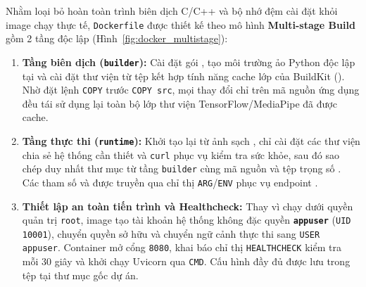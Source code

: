 Nhằm loại bỏ hoàn toàn trình biên dịch C/C++ và bộ nhớ đệm cài đặt khỏi image chạy thực tế, \texttt{Dockerfile} được thiết kế theo mô hình \textbf{Multi-stage Build} gồm 2 tầng độc lập (Hình~\ref{fig:docker_multistage}):
\begin{enumerate}
    \item \textbf{Tầng biên dịch (\texttt{builder}):} Cài đặt gói , tạo môi trường ảo Python độc lập tại  và cài đặt thư viện từ tệp  kết hợp tính năng cache lớp của BuildKit (). Nhờ đặt lệnh \texttt{COPY}  trước \texttt{COPY src}, mọi thay đổi chỉ trên mã nguồn ứng dụng đều tái sử dụng lại toàn bộ lớp thư viện TensorFlow/MediaPipe đã được cache.
    \item \textbf{Tầng thực thi (\texttt{runtime}):} Khởi tạo lại từ ảnh sạch , chỉ cài đặt các thư viện chia sẻ hệ thống cần thiết và \texttt{curl} phục vụ kiểm tra sức khỏe, sau đó sao chép duy nhất thư mục  từ tầng \texttt{builder} cùng mã nguồn  và tệp trọng số . Các tham số  và  được truyền qua chỉ thị \texttt{ARG}/\texttt{ENV} phục vụ endpoint .
    \item \textbf{Thiết lập an toàn tiến trình và Healthcheck:} Thay vì chạy dưới quyền quản trị \texttt{root}, image tạo tài khoản hệ thống không đặc quyền \textbf{\texttt{appuser}} (\texttt{UID 10001}), chuyển quyền sở hữu  và chuyển ngữ cảnh thực thi sang \texttt{USER appuser}. Container mở cổng \texttt{8080}, khai báo chỉ thị \texttt{HEALTHCHECK} kiểm tra  mỗi 30 giây và khởi chạy Uvicorn qua \texttt{CMD}. Cấu hình đầy đủ được lưu trong tệp  tại thư mục gốc dự án.
\end{enumerate}

